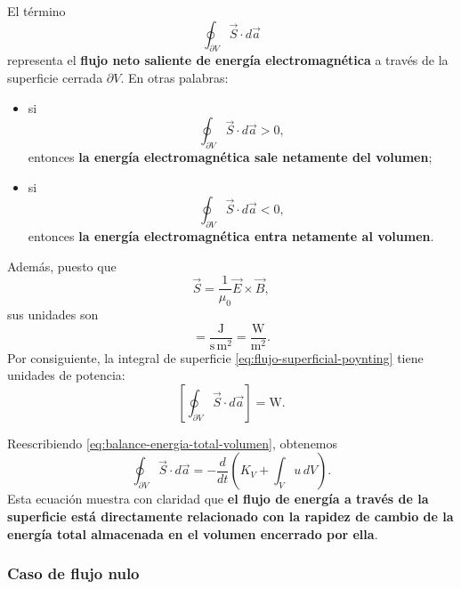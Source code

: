 \documentclass[12pt,a4paper]{article}
\theoremstyle{definition}
\theoremstyle{plain}
\numberwithin{equation}{section}
\theoremstyle{remark}
\newcommand{\E}{\vec{E}}
\newcommand{\B}{\vec{B}}
\begin{document}
El término
\begin{equation}
    \oint_{\partial V}\vec S\cdot d\vec a
    \label{eq:flujo-superficial-poynting}
\end{equation}
representa el \textbf{flujo neto saliente de energía electromagnética} a través de la superficie cerrada $\partial V$. En otras palabras:

\begin{itemize}
    \item si
    \begin{equation*}
        \oint_{\partial V}\vec S\cdot d\vec a>0,
    \end{equation*}
    entonces \textbf{la energía electromagnética sale netamente del volumen};

    \item si
    \begin{equation*}
        \oint_{\partial V}\vec S\cdot d\vec a<0,
    \end{equation*}
    entonces \textbf{la energía electromagnética entra netamente al volumen}.
\end{itemize}

Además, puesto que
\begin{equation*}
    \vec S=\frac{1}{\mu_0}\E\times\B,
\end{equation*}
sus unidades son
\begin{equation*}
    [\vec S]=\frac{\mathrm{J}}{\mathrm{s}\,\mathrm{m}^2}
    =\frac{\mathrm{W}}{\mathrm{m}^2}.
\end{equation*}
Por consiguiente, la integral de superficie \eqref{eq:flujo-superficial-poynting} tiene unidades de potencia:
\begin{equation*}
    \left[\oint_{\partial V}\vec S\cdot d\vec a\right]=\mathrm{W}.
\end{equation*}

Reescribiendo \eqref{eq:balance-energia-total-volumen}, obtenemos
\begin{equation*}
    \oint_{\partial V}\vec S\cdot d\vec a
    =
    -\frac{d}{dt}\left(
        K_V+\int_V u\,dV
    \right).
\end{equation*}
Esta ecuación muestra con claridad que \textbf{el flujo de energía a través de la superficie está directamente relacionado con la rapidez de cambio de la energía total almacenada en el volumen encerrado por ella}.

\subsubsection*{Caso de flujo nulo}
\end{document}
